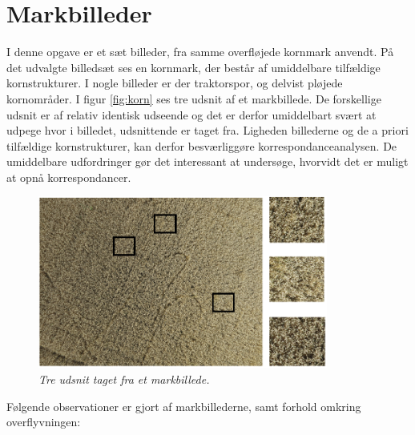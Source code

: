 \section{Markbilleder}
I denne opgave er et sæt billeder, fra samme overfløjede kornmark anvendt. På det udvalgte billedsæt ses en kornmark, der består af umiddelbare tilfældige kornstrukturer. I nogle billeder er der traktorspor, og delvist pløjede kornområder. I figur \eqref{fig:korn} ses tre udsnit af et markbillede. De forskellige udsnit er af relativ identisk udseende og det er derfor umiddelbart svært at udpege hvor i billedet, udsnittende er taget fra. Ligheden billederne og de a priori tilfældige kornstrukturer, kan derfor besværliggøre korrespondanceanalysen. De umiddelbare udfordringer gør det interessant at undersøge, hvorvidt det er muligt at opnå korrespondancer.
\begin{figure}[H]
    \centering
    \includegraphics[width=0.85\textwidth]{fig/20a.png}
    \begin{center}    
       \caption{{\footnotesize \textit{Tre udsnit taget fra et markbillede.}}}
    \label{fig:korn}
     \end{center}
     \vspace{-2.5em}
  \end{figure} \noindent
Følgende observationer er gjort af markbillederne, samt forhold omkring overflyvningen:
